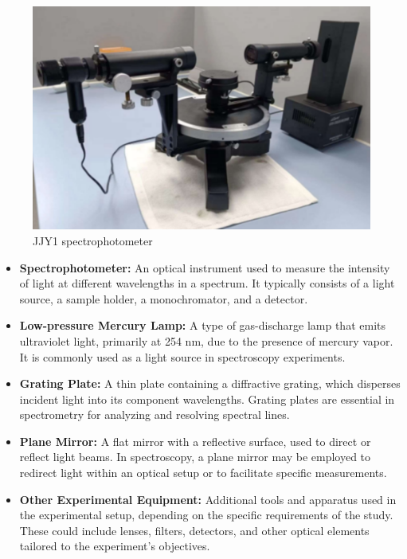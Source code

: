 \documentclass[UTF8]{article}
\begin{document}
    
   \begin{figure}[H]
   	    	\centering
   	    	\includegraphics[clip,scale=1.2,trim={0 0 0 0}]{fig/fig1.png}
   	        \caption{JJY1 spectrophotometer}
   	        \label{figure.1}
       \end{figure}   
    
	\begin{itemize}
	  \item \textbf{Spectrophotometer:} An optical instrument used to measure the intensity of light at different wavelengths in a spectrum. It typically consists of a light source, a sample holder, a monochromator, and a detector.
	  
	  \item \textbf{Low-pressure Mercury Lamp:} A type of gas-discharge lamp that emits ultraviolet light, primarily at 254 nm, due to the presence of mercury vapor. It is commonly used as a light source in spectroscopy experiments.
	  
	  \item \textbf{Grating Plate:} A thin plate containing a diffractive grating, which disperses incident light into its component wavelengths. Grating plates are essential in spectrometry for analyzing and resolving spectral lines.
	  
	  \item \textbf{Plane Mirror:} A flat mirror with a reflective surface, used to direct or reflect light beams. In spectroscopy, a plane mirror may be employed to redirect light within an optical setup or to facilitate specific measurements.
	  
	  \item \textbf{Other Experimental Equipment:} Additional tools and apparatus used in the experimental setup, depending on the specific requirements of the study. These could include lenses, filters, detectors, and other optical elements tailored to the experiment's objectives.
	\end{itemize}
	
\end{document}
